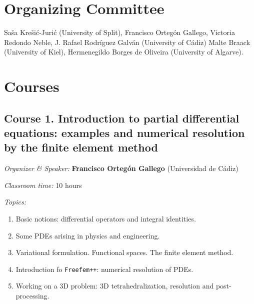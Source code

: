 \documentclass[letterpaper]{inzane_syllabus} %
\begin{document}
\vspace{0.5cm}
\section{Organizing Committee}

Saša Krešić-Jurić (University of Split), Francisco Ortegón Gallego, Victoria Redondo Neble, J. Rafael Rodríguez Galván (University of Cádiz) Malte Braack (University of Kiel), Hermenegildo Borges de Oliveira (University of Algarve). 

\newpage
\makeFullPage

\newcommand{\block}[3]{\par\textit{#1:} \textbf{#2} #3}

\section{Courses}

\subsection{Course 1. Introduction to partial differential equations: examples and numerical resolution by the finite element method}
\block{Organizer \& Speaker}{Francisco Ortegón Gallego}{(Universidad de Cádiz)}
\block{Classroom time}{}{10 hours}
\block{Topics}{}{}
\begin{enumerate}
  \item Basic notions: differential operators and integral identities. 
  \item Some PDEs arising in physics and engineering.
  \item Variational formulation. Functional spaces. The finite element method.
  \item Introduction fo \texttt{Freefem++}: numerical resolution of PDEs.
  \item Working on a 3D problem: 3D tetrahedralization, resolution and 
  post-processing.
\end{enumerate} 
\end{document}
